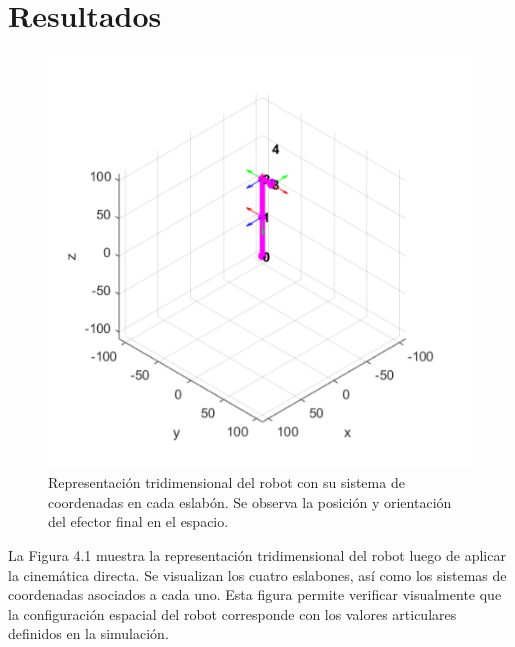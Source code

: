 

\chapter{Resultados} \label{chap:resultados}

\begin{figure}[H]  %
	\centering
	\includegraphics[width=0.7\linewidth]{img/grafica1directa}
	\caption{Representación tridimensional del robot con su sistema de coordenadas en cada eslabón. Se observa la posición y orientación del efector final en el espacio.}
	\label{fig:grafica1directa}
\end{figure}
La Figura 4.1 muestra la representación tridimensional del robot luego de aplicar la cinemática directa. Se visualizan los cuatro eslabones, así como los sistemas de coordenadas asociados a cada uno. Esta figura permite verificar visualmente que la configuración espacial del robot corresponde con los valores articulares definidos en la simulación.



